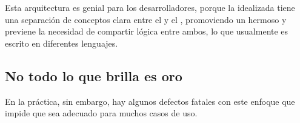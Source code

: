 Esta arquitectura es genial para los desarrolladores, porque la idealizada \singlePageAppINT tiene una separación de conceptos clara entre el \clientAS y el \serverAS, promoviendo un hermoso \workflowCPT y previene la necesidad de compartir lógica entre ambos, lo que usualmente es escrito en diferentes lenguajes.

\subsection{No todo lo que brilla es oro}

En la práctica, sin embargo, hay algunos defectos fatales con este enfoque que impide que sea adecuado para muchos casos de uso.


